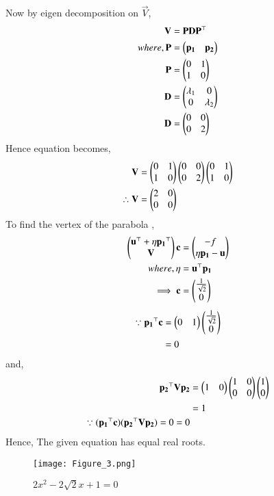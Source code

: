 \documentclass[journal,12pt,twocolumn]{IEEEtran}
\begin{document}
Now by eigen decomposition on $\vec{V}$,
\begin{align}
    \mathbf{V}&= \mathbf{P}\mathbf{D}\mathbf{P}^{\top}\\
    where,\mathbf{P}&= \begin{pmatrix}\mathbf{p_{1}}&\mathbf{p_{2}}\end{pmatrix}\\
    \mathbf{P}&=\begin{pmatrix} 0 & 1 \\ 1 & 0\end{pmatrix}\\
    \mathbf{D}&= \begin{pmatrix}\lambda_{1} & 0 \\ 0 & \lambda_{2}\end{pmatrix}\\
    \mathbf{D}&= \begin{pmatrix}0 & 0 \\ 0 & 2\end{pmatrix}
\end{align}
Hence equation becomes,
\begin{align}
    \mathbf{V}&= \begin{pmatrix} 0 & 1 \\ 1 & 0\end{pmatrix}\begin{pmatrix}0 & 0 \\ 0 & 2\end{pmatrix}\begin{pmatrix} 0 & 1 \\ 1 & 0\end{pmatrix}\\
    \therefore \mathbf{V}&=\begin{pmatrix}2 & 0 \\ 0 & 0\end{pmatrix}
\end{align}
To find the vertex of the parabola ,
\begin{align}
    \begin{pmatrix}\mathbf{u}^{\top}+ \eta \mathbf{p_1}^{\top} \\ \mathbf{V}\end{pmatrix}\mathbf{c} &= \begin{pmatrix}-f \\ \eta \mathbf{p_1}-\mathbf{u}\end{pmatrix}\\
    where, \eta &= \mathbf{u}^{\top}\mathbf{p_1}\\
    \implies
    \mathbf{c}&=\begin{pmatrix}\frac{1}{\sqrt{2}}\\0\end{pmatrix}
\end{align}
\begin{align}
    \because \mathbf{p_1}^{\top}\mathbf{c} &= \begin{pmatrix}0 & 1\end{pmatrix}\begin{pmatrix}\frac{1}{\sqrt{2}}\\0\end{pmatrix} \\
    &= 0
\end{align}
and,
\begin{align}
    \mathbf{p_2}^{\top}\mathbf{V}\mathbf{p_2}&= \begin{pmatrix}1 & 0\end{pmatrix}\begin{pmatrix}1 & 0 \\ 0 & 0\end{pmatrix}\begin{pmatrix}1 \\ 0\end{pmatrix}\\
    &= 1\\
    \because (\mathbf{p_1}^{\top}\mathbf{c}) (\mathbf{p_2}^{\top}\mathbf{V}\mathbf{p_2})=0=0 
\end{align}
Hence, The given equation has equal real roots.
\begin{figure}[htp]
    \centering
    \texttt{[image: Figure\_3.png]}
    \caption{$2x^2-2\sqrt{2}x+1=0$}
\end{figure}\\
\end{document}
